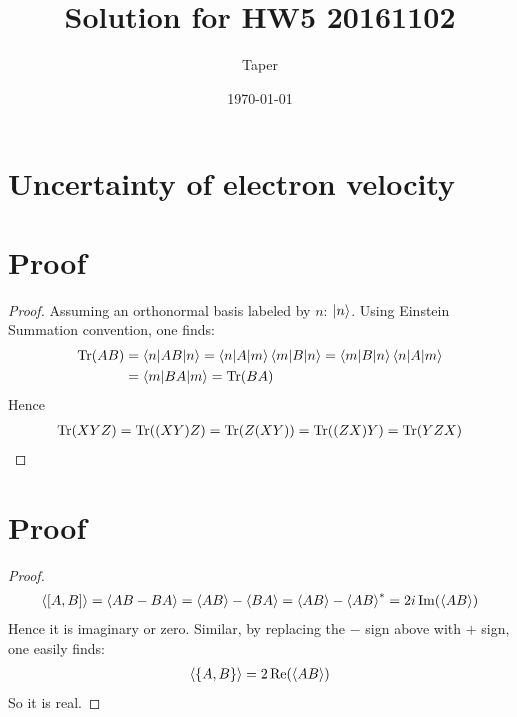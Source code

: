 \documentclass{article}
\title{Solution for HW5 20161102}
\date{\today}
\author{Taper}
\begin{document}
\maketitle
{}
\section{Uncertainty of electron velocity}

\section{Proof}
\begin{proof}
Assuming an orthonormal basis labeled by $n$: $\ket{n}$. Using
Einstein Summation convention, one finds:
\begin{align*}
    \operatorname{Tr}(AB) &= \braket{n|AB|n} = \braket{n|A|m}\braket{m|B|n}
      = \braket{m|B|n}\braket{n|A|m} \\
      &= \braket{m|BA|m} = \operatorname{Tr}(BA)
\end{align*}
Hence
\begin{align*}
    \operatorname{Tr}(XYZ) = \operatorname{Tr}( (XY) Z) = \operatorname{Tr}(Z (XY)) = \operatorname{Tr}( (ZX) Y) = \operatorname{Tr}(YZX)
\end{align*}
\end{proof}

\section{Proof}
\begin{proof}
\begin{align*}
    \braket{[A,B]} = \braket{ AB-BA} = \braket{AB} - \braket{BA} =
    \braket{AB}-\braket{AB}^* = 2i \Im(\braket{AB})
\end{align*}
Hence it is imaginary or zero. Similar, by replacing the $-$ sign
above with $+$ sign, one easily finds:
\begin{align*}
    \braket{\{A,B\}} = 2\Re(\braket{AB})
\end{align*}
So it is real.
\end{proof}
\end{document}
